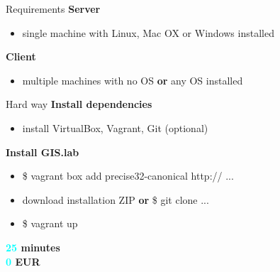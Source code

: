 \documentclass[12pt]{beamer}
\begin{document}
\begin{frame}{Requirements}
	\textbf{Server}
	\begin{itemize}
		\item single machine with Linux, Mac OX or Windows installed
	\end{itemize}
	
	\textbf{Client}
	\begin{itemize}
		\item multiple machines with no OS \textbf{or} any OS installed
	\end{itemize}
\end{frame}


\begin{frame}{Hard way}
	\textbf{Install dependencies}
	\begin{itemize}
		\item install VirtualBox, Vagrant, Git (optional)
	\end{itemize}

	\textbf{Install GIS.lab}
	\begin{itemize}
		\item \$ vagrant box add precise32-canonical http:// ...
		\item download installation ZIP \textbf{or} \$ git clone ...
		\item \$ vagrant up
	\end{itemize}
	\begin{flushleft}
		\textbf{\textcolor{Cyan}{25} minutes} \\
		\textbf{\textcolor{Cyan}{0} EUR} \\
	\end{flushleft}
\end{frame}
\end{document}
